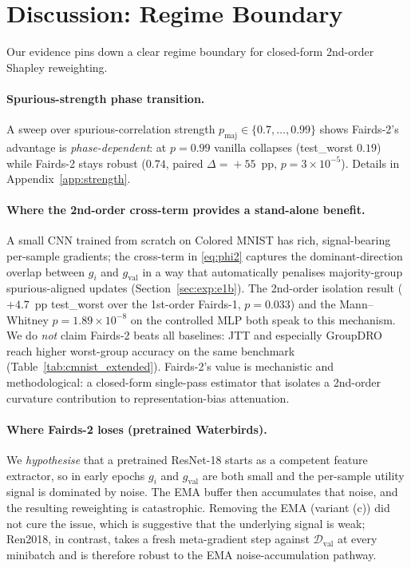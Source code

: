 \section{Discussion: Regime Boundary}
\label{sec:discussion}

Our evidence pins down a clear regime boundary for closed-form
2nd-order Shapley reweighting.

\paragraph{Spurious-strength phase transition.}
A sweep over spurious-correlation strength
$p_{\mathrm{maj}}\!\in\!\{0.7,\ldots,0.99\}$ shows Fairds-2's advantage
is \emph{phase-dependent}: at $p\!=\!0.99$ vanilla collapses
(test\_worst $0.19$) while Fairds-2 stays robust ($0.74$, paired
$\Delta\!=\!+55$~pp, $p\!=\!3\!\times\!10^{-5}$). Details in
Appendix~\ref{app:strength}.

\paragraph{Where the 2nd-order cross-term provides a stand-alone benefit.}
A small CNN trained from scratch on Colored MNIST has rich, signal-bearing
per-sample gradients; the cross-term in \eqref{eq:phi2} captures the
dominant-direction overlap between $g_i$ and $g_{\mathrm{val}}$ in a way
that automatically penalises majority-group spurious-aligned updates
(Section~\ref{sec:exp:e1b}). The 2nd-order isolation result
($+4.7$~pp test\_worst over the 1st-order Fairds-1, $p\!=\!0.033$) and
the Mann--Whitney $p\!=\!1.89\!\times\!10^{-8}$ on the controlled MLP
both speak to this mechanism. We do \emph{not} claim Fairds-2 beats
all baselines: JTT \citep{liu2021jtt} and especially GroupDRO
\citep{sagawa2020groupdro} reach higher worst-group accuracy on the
same benchmark (Table~\ref{tab:cmnist_extended}). Fairds-2's
value is mechanistic and methodological: a closed-form single-pass
estimator that isolates a 2nd-order curvature contribution to
representation-bias attenuation.

\paragraph{Where Fairds-2 loses (pretrained Waterbirds).}
We \emph{hypothesise} that a pretrained ResNet-18 starts as a competent
feature extractor, so in early epochs $g_i$ and $g_{\mathrm{val}}$ are
both small and the per-sample utility signal is dominated by noise.
The EMA buffer then accumulates that noise, and the resulting
reweighting is catastrophic. Removing the EMA (variant (c)) did not
cure the issue, which is suggestive that the underlying signal is
weak; Ren2018, in contrast, takes a fresh meta-gradient step against
$\mathcal{D}_{\mathrm{val}}$ at every minibatch and is therefore robust
to the EMA noise-accumulation pathway.

